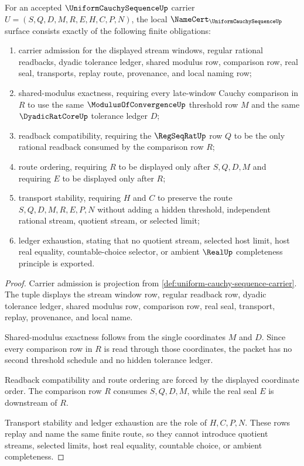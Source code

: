 \begin{theorem}
\label{thm:uniform-cauchy-sequence-namecert-obligations}
For an accepted $\UniformCauchySequenceUp$ carrier $U=(S,Q,D,M,R,E,H,C,P,N)$, the local $\NameCert_{\UniformCauchySequenceUp}$ surface consists exactly of the following finite obligations:
\begin{enumerate}
\item carrier admission for the displayed stream windows, regular rational readbacks, dyadic tolerance ledger, shared modulus row, comparison row, real seal, transports, replay route, provenance, and local naming row;
\item shared-modulus exactness, requiring every late-window Cauchy comparison in $R$ to use the same $\ModulusOfConvergenceUp$ threshold row $M$ and the same $\DyadicRatCoreUp$ tolerance ledger $D$;
\item readback compatibility, requiring the $\RegSeqRatUp$ row $Q$ to be the only rational readback consumed by the comparison row $R$;
\item route ordering, requiring $R$ to be displayed only after $S,Q,D,M$ and requiring $E$ to be displayed only after $R$;
\item transport stability, requiring $H$ and $C$ to preserve the route $S,Q,D,M,R,E,P,N$ without adding a hidden threshold, independent rational stream, quotient stream, or selected limit;
\item ledger exhaustion, stating that no quotient stream, selected host limit, host real equality, countable-choice selector, or ambient $\RealUp$ completeness principle is exported.
\end{enumerate}
\end{theorem}
\begin{proof}
Carrier admission is projection from \autoref{def:uniform-cauchy-sequence-carrier}. The tuple displays the stream window row, regular readback row, dyadic tolerance ledger, shared modulus row, comparison row, real seal, transport, replay, provenance, and local name.

Shared-modulus exactness follows from the single coordinates $M$ and $D$. Since every comparison row in $R$ is read through those coordinates, the packet has no second threshold schedule and no hidden tolerance ledger.

Readback compatibility and route ordering are forced by the displayed coordinate order. The comparison row $R$ consumes $S,Q,D,M$, while the real seal $E$ is downstream of $R$.

Transport stability and ledger exhaustion are the role of $H,C,P,N$. These rows replay and name the same finite route, so they cannot introduce quotient streams, selected limits, host real equality, countable choice, or ambient completeness.
\end{proof}

